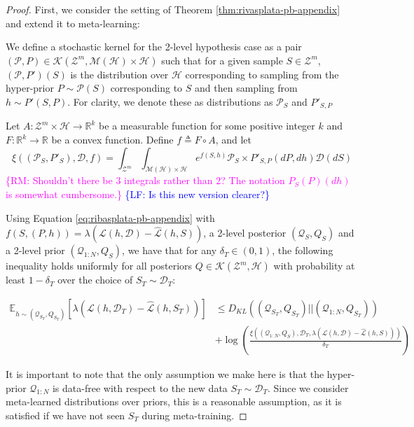 \documentclass{article}
\theoremstyle{definition}
\newcommand{\Expect}[2]{\mathbb{E}_{#1}\left [#2 \right ]}
\newcommand{\RM}[1]{\textcolor{magenta}{\{RM: #1\}}}
\newcommand{\LF}[1]{\textcolor{blue}{\{LF: #1\}}}
\begin{document}
\begin{proof}
	First, we consider the setting of Theorem \ref{thm:rivasplata-pb-appendix} and extend it to meta-learning:
	
	We define a stochastic kernel for the 2-level hypothesis case as a pair $(\mathcal{P},P)\in \mathcal{K}(\mathcal{Z}^m, \mathcal{M}(\mathcal{H})\times \mathcal{H})$ such that for a given sample $S\in \mathcal{Z}^m$,  $(\mathcal{P},P')(S)$ is the distribution over $\mathcal{H}$ corresponding to sampling from the hyper-prior $P\sim \mathcal{P}(S)$ corresponding to $S$ and then sampling from $h\sim P'(S, P)$. For clarity, we denote these as distributions as $\mathcal{P}_S$ and $P'_{S,P}$
	
	Let $A: \mathcal{Z}^m\times \mathcal{H}\rightarrow \mathbb{R}^k$ be a measurable function for some positive integer $k$ and $F:\mathbb{R}^k\rightarrow \mathbb{R}$ be a convex function.
	Define $f\triangleq F\circ A$, and let 
	$$\xi((\mathcal{P}_S,P'_S), \mathcal{D}, f)=\int_{\mathcal{Z}^m}\int_{\mathcal{M}(\mathcal{H})\times\mathcal{H}}e^{f(S, h)}\mathcal{P}_S\times P'_{S,P}(dP,dh)\mathcal{D}(dS)$$
	\RM{Shouldn't there be $3$ integrals rather than $2$? The notation $P_S(P)(dh)$ is somewhat cumbersome.} \LF{Is this new version clearer?}
	
	Using Equation \ref{eq:ribasplata-pb-appendix} with $f(S,(P,h))=\lambda(\mathcal{L}(h,\mathcal{D})-\hat{\mathcal{L}}(h,S))$, a 2-level posterior $(\mathcal{Q}_S, Q_S)$ and a 2-level prior $(\mathcal{Q}_{1:N}, Q_S)$,
	we have that for any $\delta_T \in (0,1)$, the following inequality holds uniformly for all posteriors $Q\in \mathcal{K}(\mathcal{Z}^m, \mathcal{H})$ with probability at least $1-\delta_T$ over the choice of $S_T\sim \mathcal{D}_T$:
	
	\begin{equation} \label{eq:appendix-proof-eq}
	\begin{split}
	\Expect{h\sim (\mathcal{Q}_{S_T}, Q_{S_T})}{\lambda(\mathcal{L}(h,\mathcal{D}_T)-\hat{\mathcal{L}}(h,S_T))} &\leq D_{KL}((\mathcal{Q}_{S_T}, Q_{S_T})||(\mathcal{Q}_{1:N}, Q_{S_T}))\\
	&+\log\left (\frac{\xi\left ((\mathcal{Q}_{1:N}, Q_S), \mathcal{D}_T, \lambda(\mathcal{L}(h,\mathcal{D})-\hat{\mathcal{L}}(h,S))\right )}{\delta_T}\right )
	\end{split}
	\end{equation}
	
	It is important to note that the only assumption we make here is that the hyper-prior $\mathcal{Q}_{1:N}$ is data-free with respect to the new data $S_T\sim \mathcal{D}_T$. Since we consider meta-learned distributions over priors, this is a reasonable assumption, as it is satisfied if we have not seen $S_T$ during meta-training.
	

\end{proof}
\end{document}
